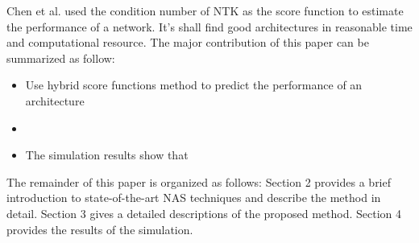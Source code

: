 \documentclass[conference]{IEEEtran}
\begin{document}
    Chen et al. used the condition number of NTK as the score function to 
    estimate the performance of a network.
    It's shall find good architectures in reasonable time and computational 
    resource.
    The major contribution of this paper can be summarized as follow:
    \begin{itemize}
        \item Use hybrid score functions method to predict the performance 
        of an architecture
        \item 
        \item The simulation results show that 
    \end{itemize}

    The remainder of this paper is organized as follows: Section 2 provides a 
    brief introduction to state-of-the-art NAS techniques and describe the 
    method in detail. Section 3 gives a detailed descriptions of the proposed 
    method. Section 4 provides the results of the simulation.

    
    
\end{document}
